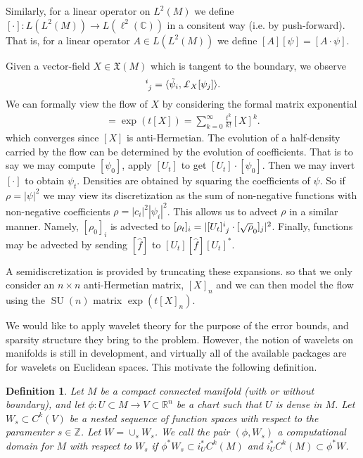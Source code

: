 \documentclass[12pt]{amsart}
\newtheorem{defn}{Definition}
\DeclareMathOperator{\SU}{SU}
\begin{document}
Similarly, for a linear operator on $L^2(M)$ we define $[\cdot ]: L( L^2(M)) \to L( \ell^2( \mathbb{C}) )$ in a consitent way (i.e. by push-forward).  That is, for a linear operator $A \in L( L^2 (M))$ we define $[A] [\psi] = [A \cdot \psi]$. 

Given a vector-field $X \in \mathfrak{X}(M)$ which is tangent to the
boundary, we observe
\begin{align*}
  [X]\indices{^i_j} = \langle \tilde{\psi}_i , \pounds_X[ \psi_j ] \rangle.
\end{align*}
We can formally view the flow of $X$ by considering the formal
matrix exponential
\begin{align*}
  [U_t] = \exp( t[X] ) = \sum_{k=0}^{\infty} \frac{t^k}{k!} [X]^k.
\end{align*}
which converges since $[X]$ is anti-Hermetian.
The evolution of a half-density carried by the flow can be determined by the evolution of coefficients.
That is to say we may compute $[\psi_0]$, apply $[U_t]$ to get $[U_t] \cdot [\psi_0]$.
Then we may invert $[\cdot]$ to obtain $\psi_t$.
Densities are obtained by squaring the coefficients of $\psi$.
So if $\rho = |\psi|^2$ we may view its discretization as the sum of non-negative functions with non-negative coefficients $\rho = |c_i|^2 |\psi_i|^2$.
This allows us to advect $\rho$ in a similar manner.
Namely, $[\rho_0]_i$ is advected to $[\rho_t]_i = | [U_t]\indices{^i_j} \cdot [\sqrt{\rho}_0]_j |^2$.
Finally, functions may be advected by sending $[\hat{f}]$ to $[U_t] [\hat{f}] [U_t]^*$.

A semidiscretization is provided by truncating these expansions.
so that we only consider an $n \times n$ anti-Hermetian matrix, $[X]_n$
and we can then model the flow using the $\SU(n)$ matrix $\exp( t [X]_n)$.

We would like to apply wavelet theory for the purpose of the error bounds,
and sparsity structure they bring to the problem.
However, the notion of wavelets on manifolds is still in development,
and virtually all of the available packages are for wavelets on Euclidean spaces.
This motivate the following definition.
\begin{defn}
  Let $M$ be a compact connected manifold (with or without boundary), and let $\phi:U \subset M \to V \subset \mathbb{R}^n$ be a chart such that $U$ is dense in $M$.
  Let $W_s \subset C^k(V)$ be a nested sequence of function spaces
  with respect to the paramenter $s \in \mathbb{Z}$.
  Let $W = \cup_s W_s$.
  We call the pair $(\phi, W_s)$ a \emph{computational domain for $M$ with respect to $W_s$}
  if $\phi^*W_s \subset i_{U}^* C^k(M)$ and $i_U^*C^k(M) \subset \phi^*W$.
\end{defn}
\end{document}

